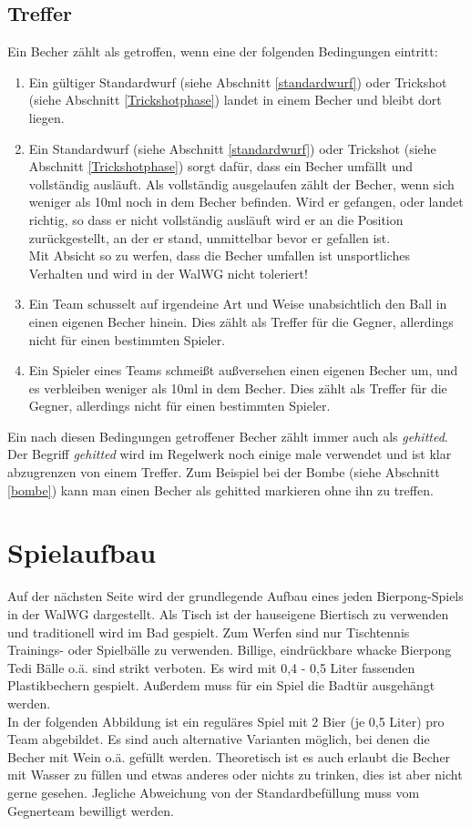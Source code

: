 \documentclass[a5paper, 12pt]{book}
\begin{document}
\section{Treffer}\label{treffer}
Ein Becher zählt als getroffen, wenn eine der folgenden Bedingungen eintritt:
\begin{enumerate} [(1)]
    \item Ein gültiger Standardwurf (siehe Abschnitt \ref{standardwurf}) oder Trickshot (siehe Abschnitt \ref{Trickshotphase}) landet in einem Becher und bleibt dort liegen.\\
    \item Ein Standardwurf (siehe Abschnitt \ref{standardwurf}) oder Trickshot (siehe Abschnitt \ref{Trickshotphase}) sorgt dafür, dass ein Becher umfällt und vollständig ausläuft. Als vollständig ausgelaufen zählt der Becher, wenn sich weniger als 10ml noch in dem Becher befinden. Wird er gefangen, oder landet richtig, so dass er nicht vollständig ausläuft wird er an die Position zurückgestellt, an der er stand, unmittelbar bevor er gefallen ist. \\
Mit Absicht so zu werfen, dass die Becher umfallen ist unsportliches Verhalten und wird in der WalWG nicht toleriert!
\item Ein Team schusselt auf irgendeine Art und Weise unabsichtlich den Ball in einen eigenen Becher hinein. Dies zählt als Treffer für die Gegner, allerdings nicht für einen bestimmten Spieler.

\item  Ein Spieler eines Teams schmeißt außversehen einen eigenen Becher um, und es verbleiben weniger als 10ml in dem Becher. Dies zählt als Treffer für die Gegner, allerdings nicht für einen bestimmten Spieler. 
\end{enumerate}
Ein nach diesen Bedingungen getroffener Becher zählt immer auch als \textit{gehitted}. Der Begriff \textit{gehitted} wird im Regelwerk noch einige male verwendet und ist klar abzugrenzen von einem Treffer. Zum Beispiel bei der Bombe (siehe Abschnitt \ref{bombe}) kann man einen Becher als gehitted markieren ohne ihn zu treffen. 
\chapter{Spielaufbau} \label{spielaufbau}
Auf der nächsten Seite wird der grundlegende Aufbau eines jeden Bierpong-Spiels in der WalWG dargestellt. Als Tisch ist der hauseigene Biertisch zu verwenden und traditionell wird im Bad gespielt. Zum Werfen sind nur Tischtennis Trainings- oder Spielbälle zu verwenden. Billige, eindrückbare whacke Bierpong Tedi Bälle o.ä. sind strikt verboten. Es wird mit 0,4 - 0,5 Liter fassenden Plastikbechern gespielt. Außerdem muss für ein Spiel die Badtür ausgehängt werden. \\
In der folgenden Abbildung ist ein reguläres Spiel mit 2 Bier (je 0,5 Liter) pro Team abgebildet. Es sind auch alternative Varianten möglich, bei denen die Becher mit Wein o.ä. gefüllt werden. Theoretisch ist es auch erlaubt die Becher mit Wasser zu füllen und etwas anderes oder nichts zu trinken, dies ist aber nicht gerne gesehen. Jegliche Abweichung von der Standardbefüllung muss vom Gegnerteam bewilligt werden.
\end{document}

